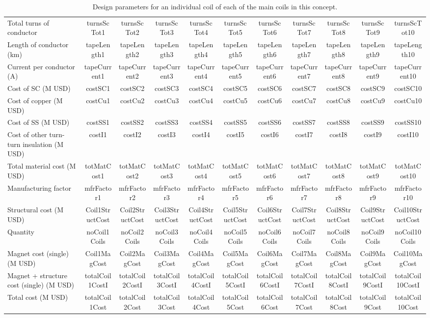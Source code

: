 \begin{table}[h]
{\begin{tabular}{lcccccccccc}
Total turns of conductor & turnsScTot1 & turnsScTot2 & turnsScTot3 & turnsScTot4 & turnsScTot5 & turnsScTot6 & turnsScTot7 & turnsScTot8 & turnsScTot9 & turnsScTot10 \\
Length of conductor (km) & tapeLength1 & tapeLength2 & tapeLength3 & tapeLength4 & tapeLength5 & tapeLength6 & tapeLength7 & tapeLength8 & tapeLength9 & tapeLength10 \\
Current per conductor (A) & tapeCurrent1 & tapeCurrent2 & tapeCurrent3 & tapeCurrent4 & tapeCurrent5 & tapeCurrent6 & tapeCurrent7 & tapeCurrent8 & tapeCurrent9 & tapeCurrent10 \\
\hline
Cost of SC (M USD) & costSC1 & costSC2 & costSC3 & costSC4 & costSC5 & costSC6 & costSC7 & costSC8 & costSC9 & costSC10 \\
Cost of copper (M USD) & costCu1 & costCu2 & costCu3 & costCu4 & costCu5 & costCu6 & costCu7 & costCu8 & costCu9 & costCu10 \\
Cost of SS (M USD) & costSS1 & costSS2 & costSS3 & costSS4 & costSS5 & costSS6 & costSS7 & costSS8 & costSS9 & costSS10 \\
Cost of other turn-turn insulation (M USD) & costI1 & costI2 & costI3 & costI4 & costI5 & costI6 & costI7 & costI8 & costI9 & costI10 \\
Total material cost (M USD) & totMatCost1 & totMatCost2 & totMatCost3 & totMatCost4 & totMatCost5 & totMatCost6 & totMatCost7 & totMatCost8 & totMatCost9 & totMatCost10 \\
Manufacturing factor & mfrFactor1 & mfrFactor2 & mfrFactor3 & mfrFactor4 & mfrFactor5 & mfrFactor6 & mfrFactor7 & mfrFactor8 & mfrFactor9 & mfrFactor10 \\
Structural cost (M USD) & Coil1StructCost & Coil2StructCost & Coil3StructCost & Coil4StructCost & Coil5StructCost & Coil6StructCost & Coil7StructCost & Coil8StructCost & Coil9StructCost & Coil10StructCost \\
Quantity & noCoil1Coils & noCoil2Coils & noCoil3Coils & noCoil4Coils & noCoil5Coils & noCoil6Coils & noCoil7Coils & noCoil8Coils & noCoil9Coils & noCoil10Coils \\
Magnet cost (single)(M USD) & Coil1MagCost & Coil2MagCost & Coil3MagCost & Coil4MagCost & Coil5MagCost & Coil6MagCost & Coil7MagCost & Coil8MagCost & Coil9MagCost & Coil10MagCost \\
Magnet + structure cost (single) (M USD) & totalCoil1CostI & totalCoil2CostI & totalCoil3CostI & totalCoil4CostI & totalCoil5CostI & totalCoil6CostI & totalCoil7CostI & totalCoil8CostI & totalCoil9CostI & totalCoil10CostI \\
\hline
Total cost (M USD) & totalCoil1Cost & totalCoil2Cost & totalCoil3Cost & totalCoil4Cost & totalCoil5Cost & totalCoil6Cost & totalCoil7Cost & totalCoil8Cost & totalCoil9Cost & totalCoil10Cost \\
\hline
\end{tabular}}
\caption{Design parameters for an individual coil of each of the main coils in this concept.}
\label{your-table-label}
\end{table}


